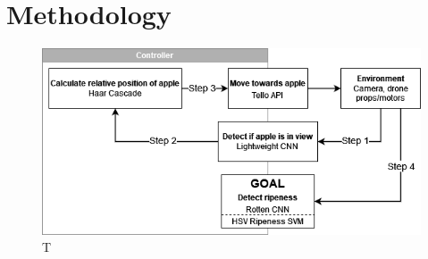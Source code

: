 \section{Methodology}

\begin{figure}[htbp]
    \fontsize{7}{5}\selectfont
    \centering
    \includegraphics[width=\columnwidth,keepaspectratio]
    {./figures/fruit-fly-model-diagram}
    \caption{
        T
    }
    \label{fig:fruit-fly-model-diagram}
\end{figure}




